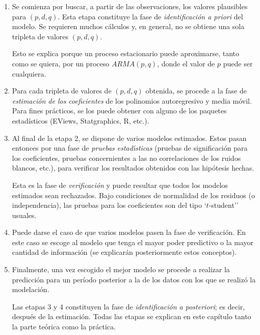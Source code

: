 \begin{enumerate}
\item Se comienza por buscar, a partir de las observaciones, los valores plausibles para $(p,d,q)$. Esta etapa constituye la fase de \emph{identificaci\'{o}n a priori} del modelo. Se requieren muchos c\'{a}lculos y, en general, no se obtiene una sola tripleta de valores $(p,d,q)$. 


Esto se explica porque un proceso estacionario puede aproximarse, tanto como 
se quiera, por un proceso $ARMA(p,q)$, donde el valor de 
$p$ puede ser cualquiera.

\item Para cada tripleta de valores de $(p,d,q)$ obtenida, se procede a la fase de \emph{estimaci\'{o}n de los coeficientes} de los polinomios autoregresivo y media m\'{o}vil. Para fines pr\'{a}cticos, se los puede obtener con alguno de los paquetes estad\'{i}sticos (EViews, Statgraphics, R, etc.).

\item Al final de la etapa 2, se dispone de varios modelos estimados. Estos pasan entonces por una fase de \emph{pruebas estad\'{\i}sticas} (pruebas de significaci\'{o}n para los coeficientes, pruebas concernientes a las no correlaciones de los ruidos blancos, etc.), para verificar los resultados obtenidos con las hip\'{o}tesis hechas.

Esta es la fase de \emph{verificaci\'{o}n} y puede resultar que todos los modelos estimados sean 
rechazados. Bajo condiciones de normalidad de los residuos (o 
independencia), las pruebas para los coeficientes son del tipo `$t$-student'' 
usuales.


\item Puede darse el caso de que varios modelos pasen la fase de verificaci\'{o}n. En este caso se escoge al modelo que tenga el mayor poder predictivo o la mayor cantidad de informaci\'{o}n (se explicar\'{a}n posteriormente estos conceptos).


\item Finalmente, una vez escogido el mejor modelo se procede a realizar la predicci\'{o}n para un per\'{i}odo posterior a la de los datos con los que se realiz\'{o} la modelaci\'{o}n.

Las etapas 3 y 4 constituyen la fase  de \emph{identificaci\'{o}n a posteriori}; es decir, despu\'{e}s de la estimaci\'{o}n. Todas las etapas se explican en este cap\'{i}tulo tanto la parte te\'{o}rica como la pr\'{a}ctica.
\end{enumerate}



